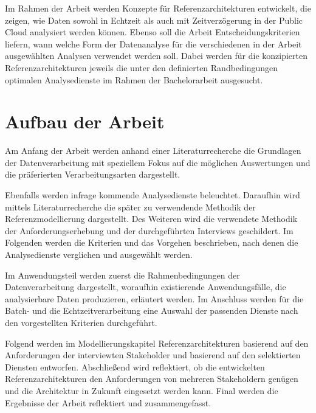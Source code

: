 Im Rahmen der Arbeit werden Konzepte für Referenzarchitekturen entwickelt, die zeigen, wie Daten sowohl in Echtzeit als auch mit Zeitverzögerung in der Public Cloud analysiert werden können. 
Ebenso soll die Arbeit Entscheidungskriterien liefern, wann welche Form der Datenanalyse für die verschiedenen in der Arbeit ausgewählten Analysen verwendet werden soll. 
Dabei werden für die konzipierten Referenzarchitekturen jeweils die unter den definierten Randbedingungen optimalen Analysedienste im Rahmen der Bachelorarbeit ausgesucht.


\section{Aufbau der Arbeit}

Am Anfang der Arbeit werden anhand einer Literaturrecherche die Grundlagen der Datenverarbeitung mit speziellem Fokus auf die möglichen Auswertungen und die präferierten Verarbeitungsarten dargestellt. 

Ebenfalls werden infrage kommende Analysedienste beleuchtet. 
Daraufhin wird mittels Literaturrecherche die später zu verwendende Methodik der Referenzmodellierung dargestellt. 
Des Weiteren wird die verwendete Methodik der Anforderungserhebung und der durchgeführten Interviews geschildert. 
Im Folgenden werden die Kriterien und das Vorgehen beschrieben, nach denen die Analysedienste verglichen und ausgewählt werden. 

Im Anwendungsteil werden zuerst die Rahmenbedingungen der Datenverarbeitung dargestellt, woraufhin existierende Anwendungsfälle, die analysierbare Daten produzieren, erläutert werden. 
Im Anschluss werden für die Batch- und die Echtzeitverarbeitung eine Auswahl der passenden Dienste nach den vorgestellten Kriterien durchgeführt. 

Folgend werden im Modellierungskapitel Referenzarchitekturen basierend auf den Anforderungen der interviewten Stakeholder und basierend auf den selektierten Diensten entworfen. Abschließend wird reflektiert, ob die entwickelten Referenzarchitekturen den Anforderungen von mehreren Stakeholdern genügen und die Architektur in Zukunft eingesetzt werden kann. Final werden die Ergebnisse der Arbeit reflektiert und zusammengefasst.

